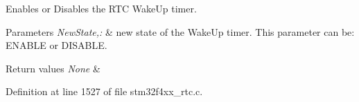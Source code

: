 Enables or Disables the R\-T\-C Wake\-Up timer. 


\begin{DoxyParams}{Parameters}
{\em New\-State,\-:} & new state of the Wake\-Up timer. This parameter can be\-: E\-N\-A\-B\-L\-E or D\-I\-S\-A\-B\-L\-E. \\
\hline
\end{DoxyParams}

\begin{DoxyRetVals}{Return values}
{\em None} & \\
\hline
\end{DoxyRetVals}


Definition at line 1527 of file stm32f4xx\-\_\-rtc.\-c.

